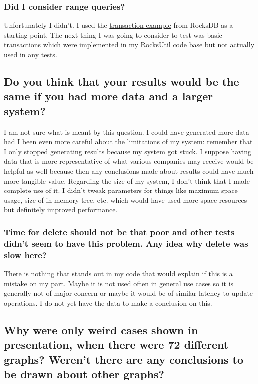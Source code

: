 \documentclass[11pt]{article}
\begin{document}
\subsubsection{Did I consider range queries?}

Unfortunately I didn't. I used the
\href{https://github.com/facebook/rocksdb/blob/master/examples/transaction_example.cc}
{transaction example} from RocksDB as a starting point. The next thing I was
going to consider to test was basic transactions which were implemented in my
RocksUtil code base but not actually used in any tests.

\subsection{Do you think that your results would be the same if you had more
data and a larger system?}

I am not sure what is meant by this question. I could have generated more data
had I been even more careful about the limitations of my system: remember that I
only stopped generating results because my system got stuck. I suppose having
data that is more representative of what various companies may receive would be
helpful as well because then any conclusions made about results could have much
more tangible value. Regarding the size of my system, I don't think that I made
complete use of it. I didn't tweak parameters for things like maximum space
usage, size of in-memory tree, etc. which would have used more space resources
but definitely improved performance.

\subsubsection{Time for delete should not be that poor and other tests didn't
  seem to have this problem. Any idea why delete was slow here?}

There is nothing that stands out in my code that would explain if this is a
mistake on my part. Maybe it is not used often in general use cases so it is
generally not of major concern or maybe it would be of similar latency to update
operations. I do not yet have the data to make a conclusion on this.

\subsection{Why were only weird cases shown in presentation, when there were 72
  different graphs? Weren't there are any conclusions to be drawn about other
graphs?}
\end{document}
